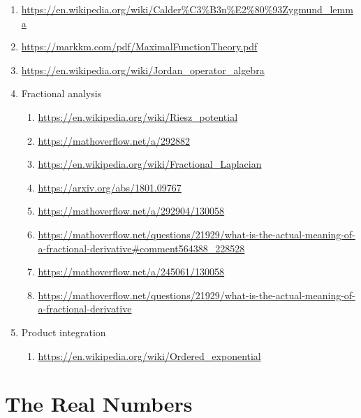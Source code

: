 \begin{enumerate}
    \item \url{https://en.wikipedia.org/wiki/Calder\%C3\%B3n\%E2\%80\%93Zygmund_lemma}
    \item \url{https://markkm.com/pdf/MaximalFunctionTheory.pdf}
    \item \url{https://en.wikipedia.org/wiki/Jordan_operator_algebra}
    \item Fractional analysis
        \begin{enumerate}
            \item \url{https://en.wikipedia.org/wiki/Riesz_potential}
            \item \url{https://mathoverflow.net/a/292882}
            \item \url{https://en.wikipedia.org/wiki/Fractional_Laplacian}
            \item \url{https://arxiv.org/abs/1801.09767}
            \item \url{https://mathoverflow.net/a/292904/130058}
            \item \url{https://mathoverflow.net/questions/21929/what-is-the-actual-meaning-of-a-fractional-derivative#comment564388_228528}
            \item \url{https://mathoverflow.net/a/245061/130058}
            \item \url{https://mathoverflow.net/questions/21929/what-is-the-actual-meaning-of-a-fractional-derivative}
        \end{enumerate}
    \item Product integration
        \begin{enumerate}
            \item \url{https://en.wikipedia.org/wiki/Ordered_exponential}
        \end{enumerate}
\end{enumerate}

\section{The Real Numbers}\label{section-the-real-numbers}
